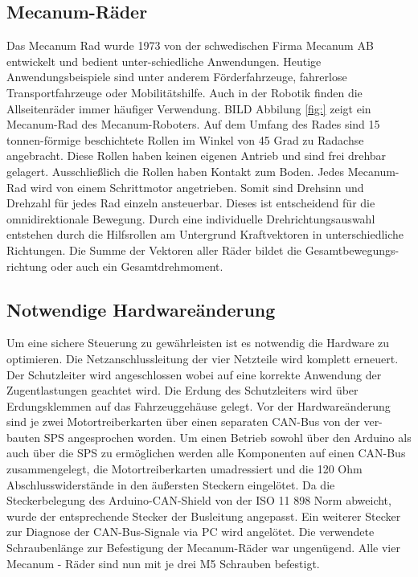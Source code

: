 \subsection{Mecanum-Räder}
\label{sec:Mecanum-Räder}
Das Mecanum Rad wurde 1973 von der schwedischen Firma Mecanum AB entwickelt und bedient unter-schiedliche Anwendungen. Heutige Anwendungsbeispiele sind unter anderem Förderfahrzeuge, fahrerlose Transportfahrzeuge oder Mobilitätshilfe. Auch in der Robotik finden die Allseitenräder immer häufiger Verwendung.
BILD
Abbilung \ref{fig:} zeigt ein Mecanum-Rad des Mecanum-Roboters. Auf dem Umfang des Rades sind 15 tonnen-förmige beschichtete Rollen im Winkel von 45 Grad zu Radachse angebracht. Diese Rollen haben keinen eigenen Antrieb und sind frei drehbar gelagert. Ausschließlich die Rollen haben Kontakt zum Boden.
Jedes Mecanum-Rad wird von einem Schrittmotor angetrieben. Somit sind Drehsinn und Drehzahl für jedes Rad einzeln ansteuerbar. Dieses ist entscheidend für die omnidirektionale Bewegung.
Durch eine individuelle Drehrichtungsauswahl entstehen durch die Hilfsrollen am Untergrund Kraftvektoren in unterschiedliche Richtungen. Die Summe der Vektoren aller Räder bildet die Gesamtbewegungs-richtung oder auch ein Gesamtdrehmoment.

\subsection{Notwendige Hardwareänderung}
Um eine sichere Steuerung zu gewährleisten ist es notwendig die Hardware zu optimieren.
Die Netzanschlussleitung der vier Netzteile wird komplett erneuert. Der Schutzleiter wird angeschlossen wobei auf eine korrekte Anwendung der Zugentlastungen geachtet wird. Die Erdung des Schutzleiters wird über Erdungsklemmen auf das Fahrzeuggehäuse gelegt.
Vor der Hardwareänderung sind je zwei Motortreiberkarten über einen separaten CAN-Bus von der ver-bauten SPS angesprochen worden. Um einen Betrieb sowohl über den Arduino als auch über die SPS zu ermöglichen werden alle Komponenten auf einen CAN-Bus zusammengelegt, die Motortreiberkarten umadressiert und die 120 Ohm Abschlusswiderstände in den äußersten Steckern eingelötet.
Da die Steckerbelegung des Arduino-CAN-Shield von der ISO 11 898 Norm abweicht, wurde der entsprechende Stecker der Busleitung angepasst. Ein weiterer Stecker zur Diagnose der CAN-Bus-Signale via PC wird angelötet.
Die verwendete Schraubenlänge zur Befestigung der Mecanum-Räder war ungenügend. Alle vier Mecanum - Räder sind nun mit je drei M5 Schrauben befestigt.